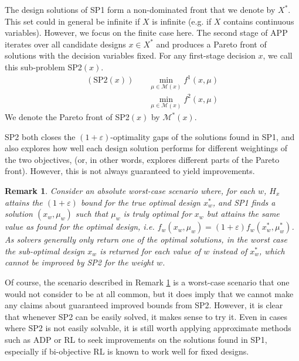 \documentclass[11pt,authoryear,a4paper]{article}
\newtheorem{remark}{Remark}
\theoremstyle{definition}
\begin{document}
{The design solutions of SP1 form a non-dominated front that we denote by $X^*$. This set could in general be infinite if $X$ is infinite (e.g. if $X$ contains continuous variables). {However, we focus on the finite case here}. The second stage of APP iterates over all candidate designs $x\in X^*$ and produces a Pareto front of solutions with the decision variables fixed. For any first-stage decision $x$, we call this sub-problem SP2$(x)$.
\begin{align*}
    (\text{SP2}(x)) \quad&\min_{\mu\in\mathcal{M}(x)}f^1(x,\mu)\\
                    &\min_{\mu\in\mathcal{M}(x)}f^2(x,\mu)
\end{align*}
We denote the Pareto front of SP2$(x)$ by $\mathcal{M}^*(x)$. {SP2 both closes the $(1+\varepsilon)$-optimality gaps of the solutions found in SP1, and also explores how well each design solution performs for different weightings of the two objectives, (or, in other words, explores different parts of the Pareto front). However, this is not always guaranteed to yield improvements.
\begin{remark}
    Consider an absolute worst-case scenario where, for each $w$, $H_x$ attains the $(1+\varepsilon)$ bound for the true optimal design $x^*_w$, and SP1 finds a solution $(x_w,\mu_w)$ such that $\mu_w$ is truly optimal for $x_w$ but attains the same value as found for the optimal design, i.e. $f_w(x_w,\mu_w)=(1+\varepsilon)f_w(x^*_w,\mu^*_w)$. As solvers generally only return one of the optimal solutions, in the worst case the sub-optimal design $x_w$ is returned for each value of $w$ instead of $x_w^*$, which cannot be improved by SP2 for the weight $w$. 
\label{sec3remark}\end{remark}
Of course, the scenario described in Remark  \ref{sec3remark} is a worst-case scenario that one would not consider to be at all common, but it does imply that we cannot make any claims about guaranteed improved bounds from SP2. However, it is clear that whenever SP2 can be easily solved, it makes sense to try it. Even in cases where SP2 is not easily solvable, it is still worth applying approximate methods such as ADP or RL to seek improvements on the solutions found in SP1, especially if bi-objective RL is known to work well for fixed designs.}

}
\end{document}
